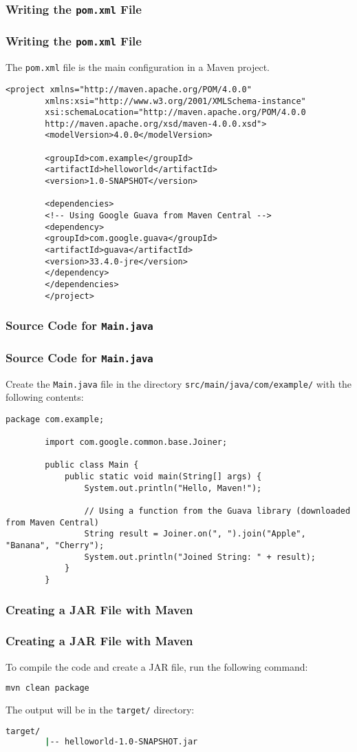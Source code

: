 \documentclass[aspectratio=169, table]{beamer}
\begin{document}
\subsubsection{Writing the \texttt{pom.xml} File}
\begin{frame}[fragile]
	\vspace{20pt}
	\frametitle{Writing the \texttt{pom.xml} File}
	The \texttt{pom.xml} file is the main configuration in a Maven project.
	\begin{lstlisting}[style=XmlStyle]
		<project xmlns="http://maven.apache.org/POM/4.0.0"
		xmlns:xsi="http://www.w3.org/2001/XMLSchema-instance"
		xsi:schemaLocation="http://maven.apache.org/POM/4.0.0
		http://maven.apache.org/xsd/maven-4.0.0.xsd">
		<modelVersion>4.0.0</modelVersion>
		
		<groupId>com.example</groupId>
		<artifactId>helloworld</artifactId>
		<version>1.0-SNAPSHOT</version>
		
		<dependencies>
		<!-- Using Google Guava from Maven Central -->
		<dependency>
		<groupId>com.google.guava</groupId>
		<artifactId>guava</artifactId>
		<version>33.4.0-jre</version>
		</dependency>
		</dependencies>
		</project>
	\end{lstlisting}
\end{frame}

\subsubsection{Source Code for \texttt{Main.java}}
\begin{frame}[fragile]
	\frametitle{Source Code for \texttt{Main.java}}
	Create the \texttt{Main.java} file in the directory \texttt{src/main/java/com/example/} with the following contents:
	\begin{lstlisting}[style=JavaStyle]
		package com.example;
		
		import com.google.common.base.Joiner;
		
		public class Main {
			public static void main(String[] args) {
				System.out.println("Hello, Maven!");
				
				// Using a function from the Guava library (downloaded from Maven Central)
				String result = Joiner.on(", ").join("Apple", "Banana", "Cherry");
				System.out.println("Joined String: " + result);
			}
		}
	\end{lstlisting}
\end{frame}

\subsubsection{Creating a JAR File with Maven}
\begin{frame}[fragile]
	\frametitle{Creating a JAR File with Maven}
	To compile the code and create a JAR file, run the following command:
	\begin{lstlisting}[language=bash]
		mvn clean package
	\end{lstlisting}
	The output will be in the \texttt{target/} directory:
	\begin{lstlisting}[language=bash]
		target/
		|-- helloworld-1.0-SNAPSHOT.jar
	\end{lstlisting}
\end{frame}
\end{document}
